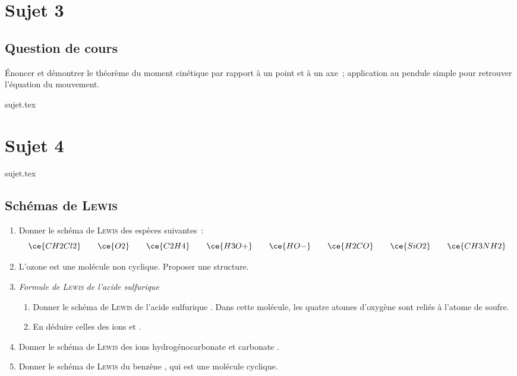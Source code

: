 \documentclass[a4paper, 11pt]{book}
\begin{document}
\chapter{Sujet 3}
\section{Question de cours}

Énoncer et démontrer le théorème du moment cinétique par rapport à un point et à
un axe~; application au pendule simple pour retrouver l'équation du mouvement.

\resetQ
{sujet.tex}

\chapter{Sujet 4}
\resetQ
{sujet.tex}

\section{Schémas de \textsc{Lewis}}
\resetQ
\begin{enumerate}
    \item Donner le schéma de \textsc{Lewis} des espèces suivantes~:
        \[
            \ce{CH2Cl2}
            \qquad
            \ce{O2}
            \qquad
            \ce{C2H4}
            \qquad
            \ce{H3O+}
            \qquad
            \ce{HO-}
            \qquad
            \ce{H2CO}
            \qquad
            \ce{SiO2}
            \qquad
            \ce{CH3NH2}
        \]
    \item L'ozone  est une molécule non cyclique. Proposer une structure.
    \item \textit{Formule de \textsc{Lewis} de l'acide sulfurique}
    \begin{enumerate}[]
        \item Donner le schéma de \textsc{Lewis} de l'acide sulfurique
            . Dans cette molécule, les quatre atomes d'oxygène sont
            reliés à l'atome de soufre.
        \item En déduire celles des ions  et .
    \end{enumerate}
    \item Donner le schéma de \textsc{Lewis} des ions hydrogénocarbonate
         et carbonate .
    \item Donner le schéma de \textsc{Lewis} du benzène , qui est une
        molécule cyclique.
\end{enumerate}
\label{LastPage}
\end{document}
